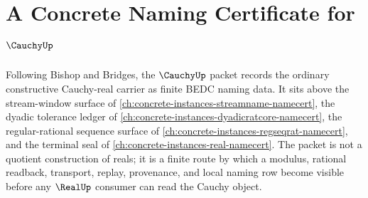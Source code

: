 \chapter{A Concrete Naming Certificate for $\CauchyUp$}
\label{ch:concrete-instances-cauchy-namecert}

Following Bishop and Bridges, the $\CauchyUp$ packet records the ordinary constructive Cauchy-real carrier as finite BEDC naming data. It sits above the stream-window surface of \autoref{ch:concrete-instances-streamname-namecert}, the dyadic tolerance ledger of \autoref{ch:concrete-instances-dyadicratcore-namecert}, the regular-rational sequence surface of \autoref{ch:concrete-instances-regseqrat-namecert}, and the terminal seal of \autoref{ch:concrete-instances-real-namecert}. The packet is not a quotient construction of reals; it is a finite route by which a modulus, rational readback, transport, replay, provenance, and local naming row become visible before any $\RealUp$ consumer can read the Cauchy object.

